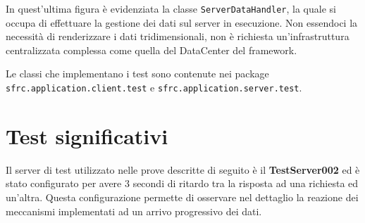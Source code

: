 In quest'ultima figura \`e evidenziata la classe \texttt{ServerDataHandler}, la quale si occupa di effettuare la gestione dei dati sul server in esecuzione. Non essendoci la necessit\`a di renderizzare i dati tridimensionali, non \`e richiesta un'infrastruttura centralizzata complessa come quella del DataCenter del framework.

Le classi che implementano i test sono contenute nei package \\\texttt{sfrc.application.client.test} e \texttt{sfrc.application.server.test}.

\section{Test significativi}
\label{sec:test}
Il server di test utilizzato nelle prove descritte di seguito \`e il \textbf{TestServer002} ed \`e stato configurato per avere $3$ secondi di ritardo tra la risposta ad una richiesta ed un'altra. Questa configurazione permette di osservare nel dettaglio la reazione dei meccanismi implementati ad un arrivo progressivo dei dati.

